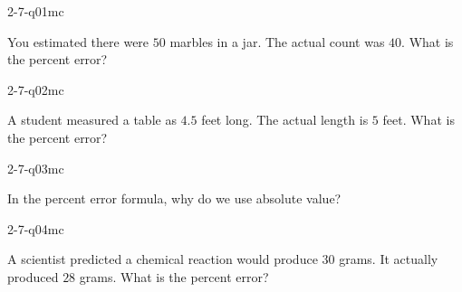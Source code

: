 

\begin{practiceQuestion}{2-7-q01}{mc}
\begin{questionText}
You estimated there were $50$ marbles in a jar. The actual count was $40$. What is the percent error?
\end{questionText}
\end{practiceQuestion}

\begin{practiceQuestion}{2-7-q02}{mc}
\begin{questionText}
A student measured a table as $4.5$ feet long. The actual length is $5$ feet. What is the percent error?
\end{questionText}
\end{practiceQuestion}

\begin{practiceQuestion}{2-7-q03}{mc}
\begin{questionText}
In the percent error formula, why do we use absolute value?
\end{questionText}
\end{practiceQuestion}

\begin{practiceQuestion}{2-7-q04}{mc}
\begin{questionText}
A scientist predicted a chemical reaction would produce $30$ grams. It actually produced $28$ grams. What is the percent error?
\end{questionText}
\end{practiceQuestion}

